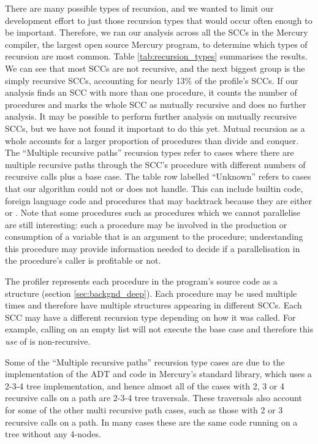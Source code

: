 There are many possible types of recursion,
and we wanted to limit our development effort to just those recursion types
that would occur often enough to be important.
Therefore,
we ran our analysis across all the SCCs in the Mercury compiler,
the largest open source Mercury program,
to determine which types of recursion are most common.
Table \ref{tab:recursion_types} summarises the results.
We can see that most SCCs are not recursive,
and the next biggest group is the simply recursive SCCs,
accounting for nearly 13\% of the profile's SCCs.
If our analysis finds an SCC with more than one procedure,
it counts the number of procedures and marks the whole SCC as
mutually recursive and does no further analysis.
It may be possible to perform further analysis on mutually recursive SCCs,
but we have not found it important to do this yet.
Mutual recursion as a whole accounts for a larger proportion of procedures
than divide and conquer.
The ``Multiple recursive paths'' recursion types refer to cases where there
are multiple recursive paths through the SCC's procedure with different
numbers of recursive calls plus a base case.
The table row labelled ``Unknown'' refers to cases that our algorithm
could not or does not handle.
This can include builtin code, foreign language code and
procedures that may backtrack because they are either \dnondet or \dmulti.
Note that some procedures such as \dsemidet procedures which we cannot
parallelise are still interesting:
such a procedure may be involved in the production or consumption of a
variable that is an argument to the procedure;
understanding this procedure may provide information needed to
decide if a parallelisation in the procedure's caller is profitable or not. 

The profiler represents each procedure in the program's source code as a \PS
structure (section \ref{sec:backgnd_deep}).
Each procedure may be used multiple times and therefore have multiple \PD
structures appearing in different SCCs.
Each SCC may have a different recursion type depending on how it was called.
For example, calling  on an empty list will not execute the base
case and therefore this \emph{use} of  is non-recursive.

Some of the ``Multiple recursive paths'' recursion type cases are due to the
implementation of the  ADT and code in Mercury's standard library,
which uses a 2-3-4 tree implementation,
and hence almost all of the cases with 2, 3 or 4 recursive calls on a path
are 2-3-4 tree traversals.
These traversals also account for some of the other multi recursive path
cases,
such as those with 2 or 3 recursive calls on a path.
In many cases these are the same code running on a tree without any 4-nodes.

